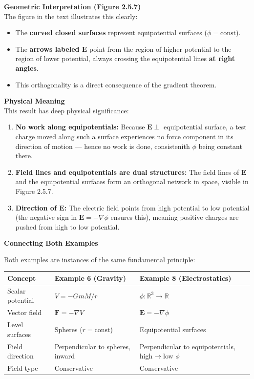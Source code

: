 \begin{respuesta}
\textbf{Geometric Interpretation (Figure 2.5.7)}\\

The figure in the text illustrates this clearly:
\begin{itemize}
    \item The \textbf{curved closed surfaces} represent equipotential surfaces ($\phi = \text{const}$).
    \item The \textbf{arrows labeled $\mathbf{E}$} point from the region of higher potential to the region of lower potential, always crossing the equipotential lines \textbf{at right angles}.
    \item This orthogonality is a direct consequence of the gradient theorem.
\end{itemize}

\textbf{Physical Meaning}\\

This result has deep physical significance:
\begin{enumerate}
    \item \textbf{No work along equipotentials:} Because $\mathbf{E} \perp$ equipotential surface, a test charge moved along such a surface experiences no force component in its direction of motion --- hence no work is done, consistenith $\phi$ being constant there.
    \item \textbf{Field lines and equipotentials are dual structures:} The field lines of $\mathbf{E}$ and the equipotential surfaces form an orthogonal network in space, visible in Figure 2.5.7.
    \item \textbf{Direction of $\mathbf{E}$:} The electric field points from high potential to low potential (the negative sign in $\mathbf{E} = -\nabla\phi$ ensures this), meaning positive charges are pushed from high to low potential.
\end{enumerate}

\textbf{Connecting Both Examples}

Both examples are instances of the same fundamental principle:



\begin{center}
\begin{tabular}{|p{3cm}|p{5cm}|p{5cm}|}
\hline
\textbf{Concept} & \textbf{Example 6 (Gravity)} & \textbf{Example 8 (Electrostatics)} \\
\hline
Scalar potential   & $V = -GmM/r$          & $\phi: \mathbb{R}^3 \to \mathbb{R}$ \\
Vector field       & $\mathbf{F} = -\nabla V$      & $\mathbf{E} = -\nabla\phi$ \\
Level surfaces     & Spheres ($r = \text{const}$)  & Equipotential surfaces \\
Field direction    & Perpendicular to spheres, inward & Perpendicular to equipotentials, high$\to$low $\phi$ \\
Field type         & Conservative                  & Conservative \\
\hline
\end{tabular}
\end{center}


\end{respuesta}
